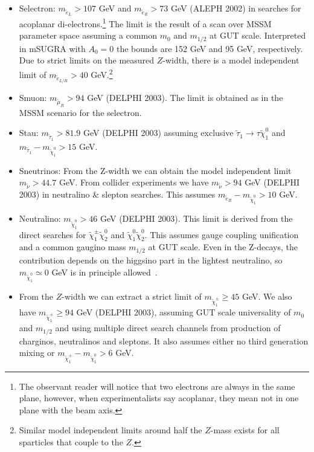 \documentclass[notes.tex]{subfiles}
\begin{document}
\begin{itemize}
\item Selectron: $m_{\tilde{e}_L}>107$ GeV and $m_{\tilde{e}_R}>73$ GeV (ALEPH 2002) in searches for acoplanar di-electrons.\footnote{The observant reader will notice that two electrons are always in the same plane, however, when experimentalists say acoplanar, they mean not in one plane with the beam axis.} The limit is the result of a scan over MSSM parameter space assuming a common $m_0$ and $m_{1/2}$ at GUT scale. Interpreted in mSUGRA with $A_0=0$ the bounds are 152 GeV and 95 GeV, respectively. Due to strict limits on the measured $Z$-width, there is a model independent limit of $m_{\tilde{e}_{L/R}}>40$ GeV.\footnote{Similar model independent limits around half the $Z$-mass exists for all sparticles that couple to the $Z$.}
\item Smuon: $m_{\tilde{\mu}_R}>94$ GeV (DELPHI 2003). The limit is obtained as in the MSSM scenario for the selectron.
\item Stau: $m_{\tilde{\tau}_1}>81.9$ GeV (DELPHI 2003) assuming exclusive $\tilde{\tau}_1 \to \tau \tilde{\chi}^0_1$ and $m_{\tilde{\tau}_1} - m_{\tilde{\chi}^0_1}> 15$ GeV.
\item Sneutrinos: From the Z-width we can obtain the model independent limit $m_{\tilde{\nu}}> 44.7$ GeV. From collider experiments we have $m_{\tilde{\nu}}>94$ GeV (DELPHI 2003) in neutralino \& slepton searches. This assumes $m_{\tilde{e}_R} - m_{\tilde{\chi}^0_1}>10$ GeV.
\item Neutralino: $m_{\tilde{\chi}^0_1}> 46$ GeV (DELPHI 2003). This limit is derived from the direct searches for $\tilde{\chi}^\pm_1 \tilde{\chi}^0_2$ and $\tilde{\chi}^0_1 \tilde{\chi}^0_2$. This assumes gauge coupling unification and a common gaugino mass $m_{1/2}$ at GUT scale. Even in the Z-decays, the contribution depends on the higgsino part in the lightest neutralino, so $m_{\tilde{\chi}^0_1} \simeq 0$ GeV is in principle allowed~\cite{Dreiner:2009ic}.
\item From the $Z$-width we can extract a strict limit of $m_{\tilde{\chi}^\pm_1}\geq 45$ GeV.
We also have $m_{\tilde{\chi}^\pm_1}\geq 94$ GeV (DELPHI 2003), assuming GUT scale universality of $m_0$ and $m_{1/2}$ and using multiple direct search channels from production of charginos, neutralinos and sleptons. It also assumes either no third generation mixing or $m_{\tilde{\chi}^\pm_1} - m_{\tilde{\chi}^0_1}>6$ GeV. 
\end{itemize}


\end{document}

